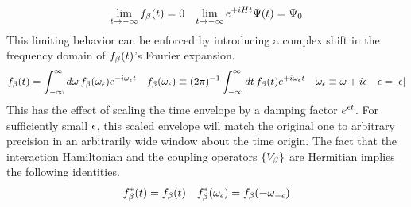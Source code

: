 \documentclass[11pt]{article}
\numberwithin{equation}{section}
\begin{document}
\begin{rmk}
\begin{align}
\label{eq:boundary-conditions}
  \lim_{t\rightarrow-\infty}
  f_{\beta }(t)
=
  0
&&
  \lim_{t\rightarrow-\infty}
  e^{+iHt}
  \Psi (t)
=
  \Psi _0
\end{align}
This limiting behavior can be enforced by introducing a complex shift in the frequency domain of $f_{\beta }(t)$'s Fourier expansion.\footnotemark
{}
\begin{align}
\label{eq:frequency-envelopes}
  f_\b(t)
=
  \int_{-\infty}^\infty
  d\w\,
  f_\b(\w_\ev)
  e^{-i\w_\ev t}
&&
  f_\b(\w_\ev)
\equiv
  (2\pi)^{-1}
  \int_{-\infty}^\infty
  dt\,
  f_\b(t)
  e^{+i\w_\ev t}
&&
  \w_\ev
\equiv
  \w
+
  i\ev
&&
  \ev
=
  |\ev|
\end{align}
This has the effect of scaling the time envelope by a damping factor $e^{\epsilon  t}$.
For sufficiently small $\epsilon $, this scaled envelope will match the original one to arbitrary precision in an arbitrarily wide window about the time origin.
The fact that the interaction Hamiltonian and the coupling operators $\{V_{\beta }\}$ are Hermitian implies the following identities.
\begin{align}
  f_{\beta }^*(t)
=
  f_{\beta }(t)
&&
  f_{\beta }^*(\omega _{\epsilon })
=
  f_{\beta }(-\omega _{-\epsilon })
\end{align}
\end{rmk}
\end{document}
